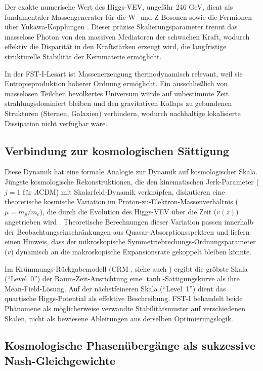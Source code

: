 \documentclass[12pt,a4paper]{article}
\theoremstyle{remark}
\begin{document}
Der exakte numerische Wert des Higgs-VEV, ungef\"ahr 246 GeV, dient als fundamentaler Massengenerator f\"ur die W- und Z-Bosonen sowie die Fermionen \"uber Yukawa-Kopplungen \citep{HiggsVEV}. Dieser pr\"azise Skalierungsparameter trennt das masselose Photon von den massiven Mediatoren der schwachen Kraft, wodurch effektiv die Disparit\"at in den Kraftst\"arken erzeugt wird, die langfristige strukturelle Stabilit\"at der Kernmaterie erm\"oglicht.

In der FST-I-Lesart ist Massenerzeugung thermodynamisch relevant, weil sie Entropieproduktion h\"oherer Ordnung erm\"oglicht. Ein ausschlie\ss{}lich von masselosen Teilchen bev\"olkertes Universum w\"urde auf unbestimmte Zeit strahlungsdominiert bleiben und den gravitativen Kollaps zu gebundenen Strukturen (Sternen, Galaxien) verhindern, wodurch nachhaltige lokalisierte Dissipation nicht verf\"ugbar w\"are.

\subsection{Verbindung zur kosmologischen S\"attigung}

Diese Dynamik hat eine formale Analogie zur Dynamik auf kosmologischer Skala. J\"ungste kosmologische Rekonstruktionen, die den kinematischen Jerk-Parameter ($j = 1$ f\"ur $\Lambda$CDM) mit Skalarfeld-Dynamik verkn\"upfen, diskutieren eine theoretische kosmische Variation im Proton-zu-Elektron-Massenverh\"altnis ($\mu = m_p/m_e$), die durch die Evolution des Higgs-VEV \"uber die Zeit ($v(z)$) angetrieben wird \citep{HiggsVEV2024}. Theoretische Berechnungen dieser Variation passen innerhalb der Beobachtungseinschr\"ankungen aus Quasar-Absorptionsspektren und liefern einen Hinweis, dass der mikroskopische Symmetriebrechungs-Ordnungsparameter ($v$) dynamisch an die makroskopische Expansionsrate gekoppelt bleiben k\"onnte.

Im Kr\"ummungs-R\"uckgabemodell (CRM \cite{GeigerCRM2026}, siehe auch \cite{FST-Unified2026}) ergibt die gr\"obste Skala (``Level~0'') der Raum-Zeit-Ausrichtung eine $\tanh$-S\"attigungskurve als ihre Mean-Field-L\"osung. Auf der n\"achstfeineren Skala (``Level~1'') dient das quartische Higgs-Potential als effektive Beschreibung. FST-I behandelt beide Ph\"anomene als m\"oglicherweise verwandte Stabilit\"atsmuster auf verschiedenen Skalen, nicht als bewiesene Ableitungen aus derselben Optimierungslogik.

\subsection[Kosmologische Phasen\"uberg\"ange als sukzessive Nash-Gleichgewichte]{Kosmologische Phasen\"uberg\"ange als sukzessive\\ Nash-Gleichgewichte}
\end{document}
